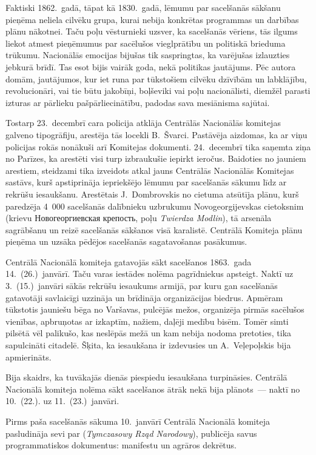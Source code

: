 \documentclass[twoside,a5paper,12pt,fleqn,openany]{extbook}
\newcommand{\pltxti}[1]{\textit{\textpolish{#1}}}
\newcommand{\rutxti}[1]{\textrussian{#1}}
\begin{document}
Faktiski 1862.~gadā, tāpat kā 1830.~gadā, lēmumu par sacelšanās sākšanu pieņēma neliela cilvēku grupa, kurai nebija konkrētas programmas un darbības plānu nākotnei. Taču poļu vēsturnieki uzsver, ka sacelšanās vēriens, tās ilgums liekot atmest pieņēmumus par sacēlušos vieglprātību un politiskā brieduma trūkumu. Nacionālās emocijas bijušas tik saspringtas, ka varējušas izlauzties jebkurā brīdī. Tas esot bijis vairāk goda, nekā politikas jautājums. Pēc autora domām, jautājumos, kur iet runa par tūkstošiem cilvēku dzīvībām un labklājību, revolucionāri, vai tie būtu jakobīņi, boļševiki vai poļu nacionālisti, diemžēl parasti izturas ar pārlieku pašpārliecinātību, padodas sava mesiānisma sajūtai.

Tostarp 23.~decembrī cara policija atklāja Centrālās Nacionālās komitejas galveno tipogrāfiju, arestēja tās locekli B.~Švarci. Pastāvēja aizdomas, ka ar viņu policijas rokās nonākuši arī Komitejas dokumenti. 24.~decembrī tika saņemta ziņa no Parīzes, ka arestēti visi turp izbraukušie iepirkt ieročus. Baidoties no jauniem arestiem, steidzami tika izveidots atkal jauns Centrālās Nacionālās Komitejas sastāvs, kurš apstiprināja iepriekšējo lēmumu par sacelšanās sākumu līdz ar rekrūšu iesaukšanu. Arestētais J.~Dombrovskis no cietuma atsūtīja plānu, kurš paredzēja 4~000 sacelšanās dalībnieku uzbrukumu Novogeorgijevskas cietoksnim (krievu \rutxti{Новогеоргиевская крепость}, poļu \pltxti{Twierdza Modlin}), tā arsenāla sagrābšanu un reizē sacelšanās sākšanos visā karalistē. Centrālā Komiteja plānu pieņēma un uzsāka pēdējos sacelšanās sagatavošanas pasākumus.

Centrālā Nacionālā komiteja gatavojās sākt sacelšanos 1863.~gada 14.~(26.)~janvārī. Taču varas iestādes nolēma pagrīdniekus apsteigt. Naktī uz 3.~(15.)~janvāri sākās rekrūšu iesaukums armijā, par kuru gan sacelšanās gatavotāji savlaicīgi uzzināja un brīdināja organizācijas biedrus. Apmēram tūkstotis jauniešu bēga no Varšavas, pulcējās mežos, organizēja pirmās sacēlušos vienības, apbruņotas ar izkaptīm, nažiem, daļēji medību bisēm. Tomēr simti pilsētā vēl palikušo, kas neslēpās mežā un kam nebija nodoma pretoties, tika sapulcināti citadelē. Šķita, ka iesaukšana ir izdevusies un A.~Veļepoļskis bija apmierināts.

Bija skaidrs, ka tuvākajās dienās piespiedu iesaukšana turpināsies. Centrālā Nacionālā komiteja nolēma sākt sacelšanos ātrāk nekā bija plānots~--- naktī no 10.~(22.). uz 11.~(23.)~janvāri.

Pirms paša sacelšanās sākuma 10.~janvārī Centrālā Nacionālā komiteja pasludināja sevi par  (\pltxti{Tymczasowy Rząd Narodowy}), publicēja savus programmatiskos dokumentus: manifestu un agrāros dekrētus.
\end{document}
